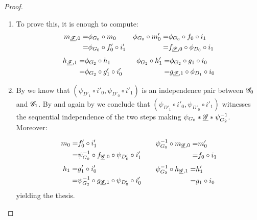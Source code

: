 \begin{proof}\begin{enumerate}
		\item To prove this, it is enough to compute:
		\[\begin{split}
			m_{\underline{\mathscr{F}},0}=&\phi_{G_0}\circ m_0\\=&\phi_{G_0}\circ f'_0\circ i'_1
		\end{split} \quad \begin{split}\phi_{G_0}\circ	m'_0=&\phi_{G_0}\circ f_0\circ i_1\\=&f_{\underline{\mathscr{F}},0}\circ \phi_{D_{0}}\circ i_1
	 \end{split} 
	\]
	\[\begin{split}
	h_{\underline{\mathscr{F}},1}=&\phi_{G_2}\circ h_1\\=&\phi_{G_2}\circ g_1' \circ i_0'
	\end{split} \qquad \begin{split}
		\phi_{G_2}\circ h'_1=&\phi_{G_2}\circ g_1\circ i_0\\=&g_{\underline{\mathscr{F}}, 1}\circ \phi_{D_1}\circ i_0
	\end{split}\]
		
		
		\item By  we know that $(\psi_{D'_1}\circ i'_0,\psi_{D'_0}\circ i'_1)$ is an independence pair between $\mathscr{G}_0$ and $\mathscr{G}_1$. By  and again by  we conclude that  $(\psi_{D'_1}\circ i'_0,\psi_{D'_0}\circ i'_1)$ witnesses the sequential independence of the two steps making $\psi_{G_0}*\underline{\mathscr{G}}*\psi^{-1}_{G_2}$. Moreover:

		
		\[\begin{split}
			m_{0}=&f'_0\circ i'_1\\=&\psi^{-1}_{G_0}\circ f_{\underline{\mathscr{G}},0}\circ \psi_{D'_0}\circ i'_1
		\end{split} \qquad \begin{split}\psi^{-1}_{G_0}\circ	m_{\underline{\mathscr{G}},0}=&m'_0\\=&f_0\circ i_1 \end{split} \]
		\[\begin{split}h_1=&g'_1\circ i'_0\\=&\psi^{-1}_{G_2}\circ g_{\underline{\mathscr{G}},1} \circ\psi_{D'_0}\circ  i_0'
		\end{split} \qquad \begin{split}
			\psi^{-1}_{G_2}\circ h_{\underline{\mathscr{G}},1}=&h'_1\\=&g_1\circ i_0\end{split} \]
		yielding the thesis. \qedhere 
	\end{enumerate}
\end{proof}


